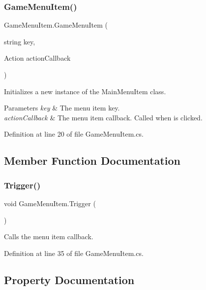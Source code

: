 \subsubsection{\texorpdfstring{Game\+Menu\+Item()}{GameMenuItem()}}
{\footnotesize\ttfamily Game\+Menu\+Item.\+Game\+Menu\+Item (\begin{DoxyParamCaption}\item[{string}]{key,  }\item[{Action}]{action\+Callback }\end{DoxyParamCaption})}



Initializes a new instance of the Main\+Menu\+Item class. 


\begin{DoxyParams}{Parameters}
{\em key} & The menu item key.\\
\hline
{\em action\+Callback} & The menu item callback. Called when is clicked.\\
\hline
\end{DoxyParams}


Definition at line 20 of file Game\+Menu\+Item.\+cs.



\subsection{Member Function Documentation}
\mbox{\label{class_game_menu_item_af2fb348206b6f5c25687879a4f5194de}} 
\subsubsection{\texorpdfstring{Trigger()}{Trigger()}}
{\footnotesize\ttfamily void Game\+Menu\+Item.\+Trigger (\begin{DoxyParamCaption}{ }\end{DoxyParamCaption})}



Calls the menu item callback. 



Definition at line 35 of file Game\+Menu\+Item.\+cs.



\subsection{Property Documentation}
\mbox{\label{class_game_menu_item_a2a0b524f6aa138e136d7e11be2007f41}} 
